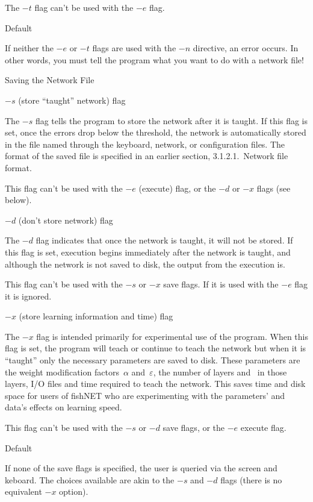 The $-t$ flag can't be used with the $-e$ flag.

\ssssec Default

If neither the $-e$ or $-t$ flags are used with the $-n$ directive,
an error occurs.
In other words, you must tell the program what you want to do with a
network file!

\sssec Saving the Network File

\ssssec $-s$ (store ``taught'' network) flag

The $-s$ flag tells the program to store the network after it is
taught.
If this flag is set, once the errors drop below the threshold, the
network is automatically stored in the file named through the
keyboard, network, or configuration files.
The format of the saved file is specified in an earlier section,
3.1.2.1.~Network file format.

This flag can't be used with the $-e$ (execute) flag, or the $-d$ or
$-x$ flags (see below).

\ssssec $-d$ (don't store network) flag

The $-d$ flag indicates that once the network is taught, it will not
be stored.
If this flag is set, execution begins immediately after the network
is taught, and although the network is not saved to disk, the output
from the execution is.

This flag can't be used with the $-s$ or $-x$ save flags. If it is
used with the $-e$ flag it is ignored.

\ssssec $-x$ (store learning information and time) flag

The $-x$ flag is intended primarily for experimental use of the
program.
When this flag is set, the program will teach or continue to teach
the network but when it is ``taught'' only the necessary parameters
are saved to disk.
These parameters are the weight modification factors~$\alpha$
and~$\varepsilon$, the number of layers and \neus\ in those layers,
I/O files and time required to teach the network.
This saves time and disk space for users of fishNET who are
experimenting with the parameters' and data's effects on
learning speed.

This flag can't be used with the $-s$ or $-d$ save flags, or the
$-e$ execute flag.

\ssssec Default

If none of the save flags is specified, the user is queried via the
screen and keboard. The choices available are akin to the $-s$ and
$-d$ flags (there is no equivalent $-x$ option).

